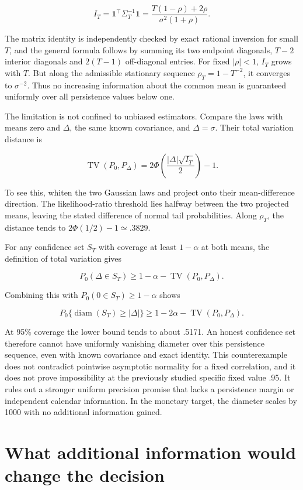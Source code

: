 \[
 I_T=\mathbf1^\top\Sigma_T^{-1}\mathbf1
   =\frac{T(1-\rho)+2\rho}{\sigma^2(1+\rho)}.
\]

The matrix identity is independently checked by exact rational inversion
for small \(T\), and the general formula follows by summing its two
endpoint diagonals, \(T-2\) interior diagonals and \(2(T-1)\)
off-diagonal entries. For fixed \(|\rho|<1\), \(I_T\) grows with \(T\).
But along the admissible stationary sequence \(\rho_T=1-T^{-2}\), it
converges to \(\sigma^{-2}\). Thus no increasing information about the
common mean is guaranteed uniformly over all persistence values below
one.

The limitation is not confined to unbiased estimators. Compare the laws
with means zero and \(\Delta\), the same known covariance, and
\(\Delta=\sigma\). Their total variation distance is

\[
 \operatorname{TV}(P_0,P_\Delta)
 =2\Phi\left(\frac{|\Delta|\sqrt{I_T}}2\right)-1.
\]

To see this, whiten the two Gaussian laws and project onto their
mean-difference direction. The likelihood-ratio threshold lies halfway
between the two projected means, leaving the stated difference of normal
tail probabilities. Along \(\rho_T\), the distance tends to
\(2\Phi(1/2)-1\simeq.3829\).

For any confidence set \(S_T\) with coverage at least \(1-\alpha\) at
both means, the definition of total variation gives

\[
 P_0(\Delta\in S_T)\geq1-\alpha-\operatorname{TV}(P_0,P_\Delta).
\]

Combining this with \(P_0(0\in S_T)\geq1-\alpha\) shows

\[
 P_0\{\operatorname{diam}(S_T)\geq|\Delta|\}
 \geq1-2\alpha-\operatorname{TV}(P_0,P_\Delta).
\]

At 95\% coverage the lower bound tends to about .5171. An honest
confidence set therefore cannot have uniformly vanishing diameter over
this persistence sequence, even with known covariance and exact
identity. This counterexample does not contradict pointwise asymptotic
normality for a fixed correlation, and it does not prove impossibility
at the previously studied specific fixed value .95. It rules out a
stronger uniform precision promise that lacks a persistence margin or
independent calendar information. In the monetary target, the diameter
scales by 1000 with no additional information gained.

\hypertarget{what-additional-information-would-change-the-decision}{%
\section{What additional information would change the
decision}\label{what-additional-information-would-change-the-decision}}


